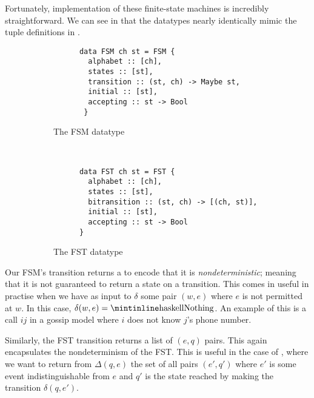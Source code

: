 \documentclass[10pt, a4paper]{report}
\begin{document}
Fortunately, implementation of these finite-state machines is incredibly
straightforward. We can see in  that the datatypes nearly
identically mimic the tuple definitions in .


\begin{figure}[h]
  \centering
  \begin{subfigure}[b]{0.5\textwidth}
    \begin{verbatim}
      data FSM ch st = FSM {
        alphabet :: [ch],              
        states :: [st],               
        transition :: (st, ch) -> Maybe st,
        initial :: [st],            
        accepting :: st -> Bool    
       }
    \end{verbatim}
    \caption{The FSM datatype}
  \end{subfigure}%
~
  \begin{subfigure}[b]{0.5\textwidth}
    \begin{verbatim}
      data FST ch st = FST {
        alphabet :: [ch],                     
        states :: [st],                       
        bitransition :: (st, ch) -> [(ch, st)],
        initial :: [st],                      
        accepting :: st -> Bool              
      }
    \end{verbatim}
    \caption{The FST datatype}
  \end{subfigure}
  \caption{}
  \label{fig:FSMFST}
\end{figure}

Our FSM's transition returns a  to encode that it is
\emph{nondeterministic}; meaning that it is not guaranteed to return a state on
a transition. This comes in useful in practise when we have as input to $\delta$
some pair $(w, e)$ where $e$ is not permitted at $w$. In this case, $\delta(w,
e) = \text{\mih{Nothing}}$. An example of this is a call $ij$ in a gossip model
where $i$ does not know $j$'s phone number.

Similarly, the FST transition returns a list of $(e, q)$ pairs. This again
encapsulates the nondeterminism of the FST. This is useful in the case of
, where we want to return from
$\Delta(q, e)$ the set of all pairs $(e', q')$ where $e'$ is some event
indistinguishable from $e$ and $q'$ is the state reached by making the
transition $\delta(q, e')$.
\end{document}
